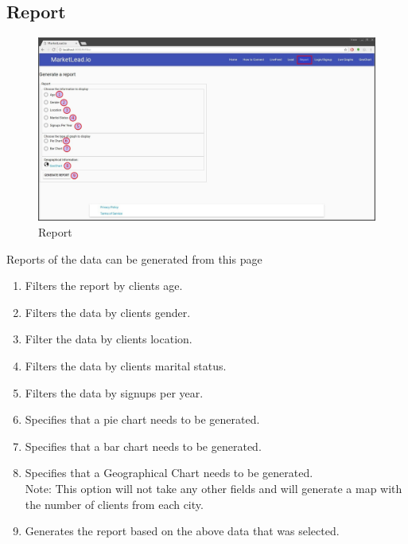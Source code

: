\documentclass{article}
\begin{document}
		\subsection{Report}
			\begin{figure}[H]
				\includegraphics[width=\textwidth]{images/report.jpg}
				\caption{Report}
				\label{fig:report}
			\end{figure}
			Reports of the data can be generated from this page
			\begin{enumerate}
				\item Filters the report by clients age.
				\item Filters the data by clients gender.
				\item Filter the data by clients location.
				\item Filters the data by clients marital status.
				\item Filters the data by signups per year.
				\item Specifies that a pie chart needs to be generated.
				\item Specifies that a bar chart needs to be generated.
				\item Specifies that a Geographical Chart needs to be generated.\\
					Note: This option will not take any other fields and will generate a map with the number of clients from each city.
				\item Generates the report based on the above data that was selected.
			\end{enumerate}
\end{document}
